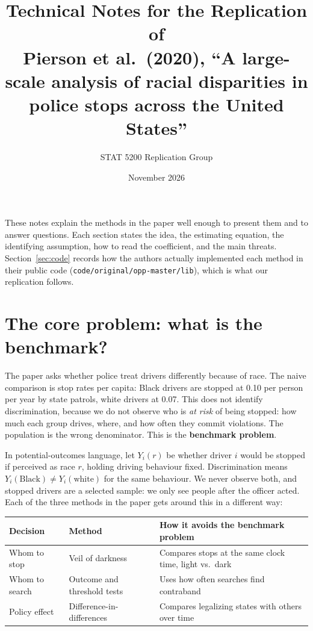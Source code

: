 \documentclass[11pt]{article}
\title{Technical Notes for the Replication of\\ Pierson et al.\ (2020), ``A large-scale analysis of racial disparities in police stops across the United States''}
\author{STAT 5200 Replication Group}
\date{November 2026}
\newcommand{\1}{\mathbf{1}}
\begin{document}
\maketitle

\noindent These notes explain the methods in the paper well enough to present them and to answer questions. Each section states the idea, the estimating equation, the identifying assumption, how to read the coefficient, and the main threats. Section~\ref{sec:code} records how the authors actually implemented each method in their public code (\texttt{code/original/opp-master/lib}), which is what our replication follows.

\tableofcontents

\section{The core problem: what is the benchmark?}

The paper asks whether police treat drivers differently because of race. The naive comparison is stop rates per capita: Black drivers are stopped at 0.10 per person per year by state patrols, white drivers at 0.07. This does not identify discrimination, because we do not observe who is \emph{at risk} of being stopped: how much each group drives, where, and how often they commit violations. The population is the wrong denominator. This is the \textbf{benchmark problem}.

In potential-outcomes language, let $Y_i(r)$ be whether driver $i$ would be stopped if perceived as race $r$, holding driving behaviour fixed. Discrimination means $Y_i(\text{Black}) \neq Y_i(\text{white})$ for the same behaviour. We never observe both, and stopped drivers are a selected sample: we only see people after the officer acted. Each of the three methods in the paper gets around this in a different way:

\begin{center}
\begin{tabular}{@{}lll@{}}
\toprule
Decision & Method & How it avoids the benchmark problem \\
\midrule
Whom to stop & Veil of darkness & Compares stops at the same clock time, light vs.\ dark \\
Whom to search & Outcome and threshold tests & Uses how often searches find contraband \\
Policy effect & Difference-in-differences & Compares legalizing states with others over time \\
\bottomrule
\end{tabular}
\end{center}
\end{document}
